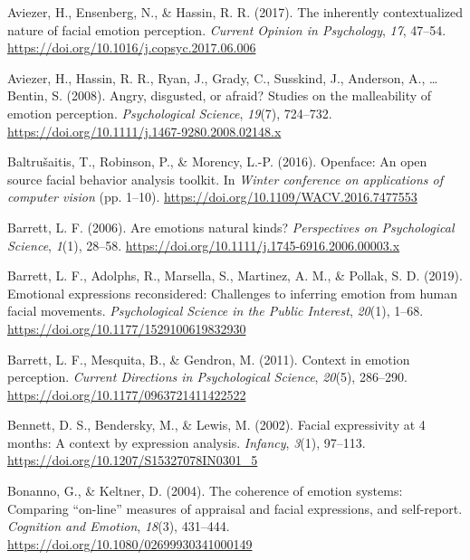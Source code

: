 \documentclass[
  english,
  doc]{apa7}
\newlength{\cslhangindent}
\newenvironment{cslreferences}%
  {\setlength{\parindent}{0pt}%
  \everypar{\setlength{\hangindent}{\cslhangindent}}\ignorespaces}%
  {\par}
\begin{document}
\begingroup
\setlength{\parindent}{-0.5in}
\setlength{\leftskip}{0.5in}

\hypertarget{refs}{}
\begin{cslreferences}
\leavevmode\hypertarget{ref-aviezer2017inherently}{}%
Aviezer, H., Ensenberg, N., \& Hassin, R. R. (2017). The inherently contextualized nature of facial emotion perception. \emph{Current Opinion in Psychology}, \emph{17}, 47--54. \url{https://doi.org/10.1016/j.copsyc.2017.06.006}

\leavevmode\hypertarget{ref-aviezer2008angry}{}%
Aviezer, H., Hassin, R. R., Ryan, J., Grady, C., Susskind, J., Anderson, A., \ldots{} Bentin, S. (2008). Angry, disgusted, or afraid? Studies on the malleability of emotion perception. \emph{Psychological Science}, \emph{19}(7), 724--732. \url{https://doi.org/10.1111/j.1467-9280.2008.02148.x}

\leavevmode\hypertarget{ref-baltruvsaitis2016openface}{}%
Baltrušaitis, T., Robinson, P., \& Morency, L.-P. (2016). Openface: An open source facial behavior analysis toolkit. In \emph{Winter conference on applications of computer vision} (pp. 1--10). \url{https://doi.org/10.1109/WACV.2016.7477553}

\leavevmode\hypertarget{ref-barrett2006emotions}{}%
Barrett, L. F. (2006). Are emotions natural kinds? \emph{Perspectives on Psychological Science}, \emph{1}(1), 28--58. \url{https://doi.org/10.1111/j.1745-6916.2006.00003.x}

\leavevmode\hypertarget{ref-barrett2019emotional}{}%
Barrett, L. F., Adolphs, R., Marsella, S., Martinez, A. M., \& Pollak, S. D. (2019). Emotional expressions reconsidered: Challenges to inferring emotion from human facial movements. \emph{Psychological Science in the Public Interest}, \emph{20}(1), 1--68. \url{https://doi.org/10.1177/1529100619832930}

\leavevmode\hypertarget{ref-barrett2011context}{}%
Barrett, L. F., Mesquita, B., \& Gendron, M. (2011). Context in emotion perception. \emph{Current Directions in Psychological Science}, \emph{20}(5), 286--290. \url{https://doi.org/10.1177/0963721411422522}

\leavevmode\hypertarget{ref-bennett2002facial}{}%
Bennett, D. S., Bendersky, M., \& Lewis, M. (2002). Facial expressivity at 4 months: A context by expression analysis. \emph{Infancy}, \emph{3}(1), 97--113. \url{https://doi.org/10.1207/S15327078IN0301_5}

\leavevmode\hypertarget{ref-bonanno2004brief}{}%
Bonanno, G., \& Keltner, D. (2004). The coherence of emotion systems: Comparing ``on-line'' measures of appraisal and facial expressions, and self-report. \emph{Cognition and Emotion}, \emph{18}(3), 431--444. \url{https://doi.org/10.1080/02699930341000149}


\end{cslreferences}
\end{document}

